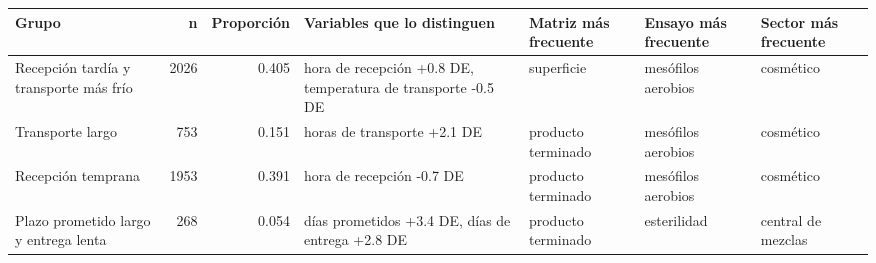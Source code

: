 \begin{tabular}{lrrllll}
\toprule
Grupo & n & Proporción & Variables que lo distinguen & Matriz más frecuente & Ensayo más frecuente & Sector más frecuente \\
\midrule
Recepción tardía y transporte más frío & 2026 & 0.405 & hora de recepción +0.8 DE, temperatura de transporte -0.5 DE & superficie & mesófilos aerobios & cosmético \\
Transporte largo & 753 & 0.151 & horas de transporte +2.1 DE & producto terminado & mesófilos aerobios & cosmético \\
Recepción temprana & 1953 & 0.391 & hora de recepción -0.7 DE & producto terminado & mesófilos aerobios & cosmético \\
Plazo prometido largo y entrega lenta & 268 & 0.054 & días prometidos +3.4 DE, días de entrega +2.8 DE & producto terminado & esterilidad & central de mezclas \\
\bottomrule
\end{tabular}
